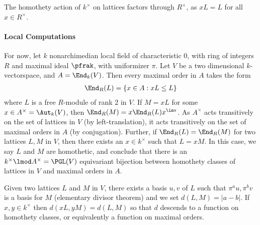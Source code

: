\documentclass[draft]{article}
\begin{document}
\begin{remark}
    \begin{enumerate*}
        \item The homothety action of $k^\times$ on lattices factors through $R^\times$, as $xL = L$ for all $x \in R^\times$. 
    \end{enumerate*}
      
\end{remark}
 


\paragraph*{Local Computations} 
For now, let $k$ nonarchimedian local field of characteristic $0$, with ring of integers $R$ and maximal ideal $\pfrak$, with uniformizer $\pi$. Let $V$ be a two dimensional $k$-vectorspace, and $A = \End_k(V)$. Then every maximal order in $A$ takes the form 
\begin{align*}
    \End_R(L) = \{ x \in A : xL\leq L\}
\end{align*}
where $L$ is a free $R$-module of rank $2$ in $V$. If $M = xL$ for some $x\in A^\times = \Aut_k(V)$, then $\End_R(M) = x\End_R(L)x^\inv$. As $A^\times$ acts transitively on the set of lattices in $V$ (by left-translation), it acts transitively on the set of maximal orders in $A$ (by conjugation). Further, if $\End_R(L)=\End_R(M)$ for two lattices $L,M$ in $V$, then there exists an $x \in k^\times$ such that $L = x M$. In this case, we say $L$ and $M$ are homothetic, and conclude that there is an $k^\times \lmod A^\times = \PGL(V)$ equivariant bijection between homothety classes of lattices in $V$ and maximal orders in $A$. 

Given two lattices $L$ and $M$ in $V$, there exists a basis $u,v$ of $L$ such that $\pi^a u , \pi^b v$ is a basis for $M$ (elementary divisor theorem) and we set $d(L,M) = |a-b|$. If $x,y\in k^\times$ then $d(xL,yM)=d(L,M)$ so that $d$ descends to a function on homothety classes, or equivalently a function on maximal orders. 


\cite{sallyFourierTransformOrbital1983}


\end{document}
